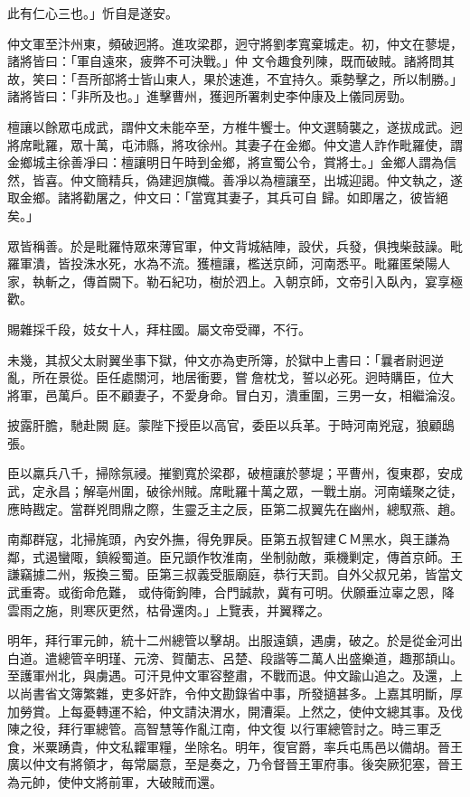 \begin{pinyinscope}
 此有仁心三也。」忻自是遂安。



 仲文軍至汴州東，頻破迥將。進攻梁郡，迥守將劉孝寬棄城走。初，仲文在蓼堤，諸將皆曰：「軍自遠來，疲弊不可決戰。」仲
 文令趣食列陳，既而破賊。諸將問其故，笑曰：「吾所部將士皆山東人，果於速進，不宜持久。乘勢擊之，所以制勝。」諸將皆曰：「非所及也。」進擊曹州，獲迥所署刺史李仲康及上儀同房勁。



 檀讓以餘眾屯成武，謂仲文未能卒至，方椎牛饗士。仲文選騎襲之，遂拔成武。迥將席毗羅，眾十萬，屯沛縣，將攻徐州。其妻子在金鄉。仲文遣人詐作毗羅使，謂金鄉城主徐善凈曰：檀讓明日午時到金鄉，將宣蜀公令，賞將士。」金鄉人謂為信然，皆喜。仲文簡精兵，偽建迥旗幟。善凈以為檀讓至，出城迎謁。仲文執之，遂取金鄉。諸將勸屠之，仲文曰：「當寬其妻子，其兵可自
 歸。如即屠之，彼皆絕矣。」



 眾皆稱善。於是毗羅恃眾來薄官軍，仲文背城結陣，設伏，兵發，俱拽柴鼓譟。毗羅軍潰，皆投洙水死，水為不流。獲檀讓，檻送京師，河南悉平。毗羅匿榮陽人家，執斬之，傳首闕下。勒石紀功，樹於泗上。入朝京師，文帝引入臥內，宴享極歡。



 賜雜採千段，妓女十人，拜柱國。屬文帝受禪，不行。



 未幾，其叔父太尉翼坐事下獄，仲文亦為吏所簿，於獄中上書曰：「曩者尉迥逆亂，所在景從。臣任處關河，地居衝要，嘗詹枕戈，誓以必死。迥時購臣，位大將軍，邑萬戶。臣不顧妻子，不愛身命。冒白刃，潰重圍，三男一女，相繼淪沒。



 披露肝膽，馳赴闕
 庭。蒙陛下授臣以高官，委臣以兵革。于時河南兇寇，狼顧鴟張。



 臣以羸兵八千，掃除氛祲。摧劉寬於梁郡，破檀讓於蓼堤；平曹州，復東郡，安成武，定永昌；解亳州圍，破徐州賊。席毗羅十萬之眾，一戰土崩。河南蟻聚之徒，應時戡定。當群兇問鼎之際，生靈乏主之辰，臣第二叔翼先在幽州，總馭燕、趙。



 南鄰群寇，北掃旄頭，內安外撫，得免罪戾。臣第五叔智建ＣＭ黑水，與王謙為鄰，式遏蠻陬，鎮綏蜀道。臣兄顗作牧淮南，坐制勍敵，乘機剿定，傳首京師。王謙竊據二州，叛換三蜀。臣第三叔義受脤廟庭，恭行天罰。自外父叔兄弟，皆當文武重寄。或銜命危難，
 或侍衛鉤陣，合門誠款，冀有可明。伏願垂泣辜之恩，降雲雨之施，則寒灰更然，枯骨還肉。」上覽表，并翼釋之。



 明年，拜行軍元帥，統十二州總管以擊胡。出服遠鎮，遇虜，破之。於是從金河出白道。遣總管辛明瑾、元滂、賀蘭志、呂楚、段諧等二萬人出盛樂道，趣那頡山。至護軍州北，與虜遇。可汗見仲文軍容整肅，不戰而退。仲文踰山追之。及還，上以尚書省文簿繁雜，吏多奸詐，令仲文勘錄省中事，所發擿甚多。上嘉其明斷，厚加勞賞。上每憂轉運不給，仲文請決渭水，開漕渠。上然之，使仲文總其事。及伐陳之役，拜行軍總管。高智慧等作亂江南，仲文復
 以行軍總管討之。時三軍乏食，米粟踴貴，仲文私糶軍糧，坐除名。明年，復官爵，率兵屯馬邑以備胡。晉王廣以仲文有將領才，每常屬意，至是奏之，乃令督晉王軍府事。後突厥犯塞，晉王為元帥，使仲文將前軍，大破賊而還。




\end{pinyinscope}
